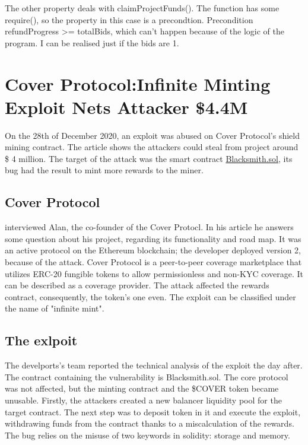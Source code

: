 The other property deals with claimProjectFunds(). The function has some require(), so the property in this case is a precondtion. 
Precondition refundProgress >= totalBids, which can't happen because of the logic of the program. 
I can be realised just if the bids are 1.




\section{Cover Protocol:Infinite Minting Exploit Nets Attacker \$4.4M }
\label{sec:Exploits:CoverProtocol}
On the 28th of December 2020, an exploit was abused on Cover Protocol's shield mining contract. 
The article shows the attackers could steal from project around \$ 4 million. 
The target of the attack was the smart contract \href{https://github.com/CoverProtocol/cover-token-mining/blob/main/contracts/Blacksmith.sol}{Blacksmith.sol}, its bug had the result to mint more rewards to the miner. 

\subsection{Cover Protocol}
\label{sec:CoverProtocol:Presentation}

\citet{CoverProtocol} interviewed Alan, the co-founder of the Cover Protocl. In his article he answers some question about his project, regarding its functionality and road map. 
It was an active protocol on the Ethereum blockchain; the developer deployed version 2,  because of the attack. 
Cover Protocol is a peer-to-peer coverage marketplace that utilizes ERC-20 fungible tokens to allow permissionless and non-KYC coverage. 
It can be described as a coverage provider.
The attack affected the rewards contract, consequently, the token's one even.  
The exploit can be classified under the name of "infinite mint".

\subsection{The exlpoit}
\label{sec:CoverProtocol:Exploit}
The develports's team reported \citep{CoverProtocolPostMortem} the technical analysis of the exploit the day after.
The contract containing the vulnerability is Blacksmith.sol. The core protocol was not affected, 
but the minting contract and the \$COVER token became unusable.
Firstly, the attackers created a new balancer liquidity pool for the target contract. The next step was to deposit token in it and execute the exploit, 
withdrawing funds from the contract thanks to a miscalculation of the rewards.
The bug relies on the misuse of two keywords in solidity: storage and memory. 

